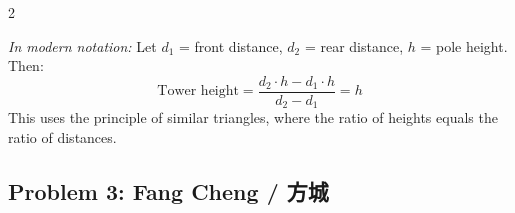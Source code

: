 \documentclass[11pt,a4paper]{article}
\begin{document}
\begin{paracol}{2}
\begin{rightcolumn}
\medskip
\textit{In modern notation:} Let $d_1$ = front distance, $d_2$ = rear 
distance, $h$ = pole height. Then:
\[
\text{Tower height} = \frac{d_2 \cdot h - d_1 \cdot h}{d_2 - d_1} = h
\]
This uses the principle of similar triangles, where the ratio of heights 
equals the ratio of distances.
\end{rightcolumn}

\end{paracol}

\vspace{1em}

\subsection*{Problem 3: Fang Cheng / 方城}
\end{document}
